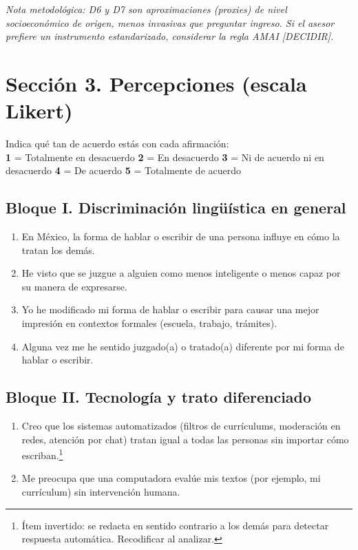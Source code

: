 \noindent\textit{Nota metodológica: D6 y D7 son aproximaciones (proxies) de
nivel socioeconómico de origen, menos invasivas que preguntar ingreso. Si el
asesor prefiere un instrumento estandarizado, considerar la regla AMAI
[DECIDIR].}

\section*{Sección 3. Percepciones (escala Likert)}

\noindent Indica qué tan de acuerdo estás con cada afirmación: \\
\textbf{1} = Totalmente en desacuerdo \quad \textbf{2} = En desacuerdo \quad
\textbf{3} = Ni de acuerdo ni en desacuerdo \quad \textbf{4} = De acuerdo
\quad \textbf{5} = Totalmente de acuerdo

\subsection*{Bloque I. Discriminación lingüística en general}

\begin{enumerate}[label=\textbf{L\arabic*.}]
  \item En México, la forma de hablar o escribir de una persona influye en
    cómo la tratan los demás.
  \item He visto que se juzgue a alguien como menos inteligente o menos capaz
    por su manera de expresarse.
  \item Yo he modificado mi forma de hablar o escribir para causar una mejor
    impresión en contextos formales (escuela, trabajo, trámites).
  \item Alguna vez me he sentido juzgado(a) o tratado(a) diferente por mi
    forma de hablar o escribir.
\end{enumerate}

\subsection*{Bloque II. Tecnología y trato diferenciado}

\begin{enumerate}[label=\textbf{L\arabic*.},resume]
  \item Creo que los sistemas automatizados (filtros de currículums,
    moderación en redes, atención por chat) tratan igual a todas las personas
    sin importar cómo escriban.\footnote{Ítem invertido: se redacta en sentido
    contrario a los demás para detectar respuesta automática. Recodificar al
    analizar.}
  \item Me preocupa que una computadora evalúe mis textos (por ejemplo, mi
    currículum) sin intervención humana.
\end{enumerate}

